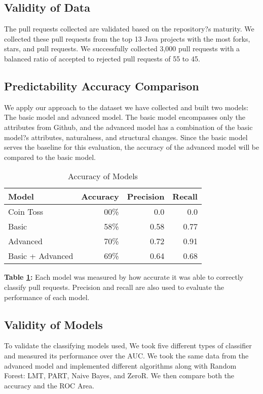 \documentclass[10pt, conference]{IEEEtran}
\begin{document}
\subsection{Validity of Data}
The pull requests collected are validated based on the repository?s maturity. We collected these pull requests from the top 13 Java projects with the most forks, stars, and pull requests. We successfully collected 3,000 pull requests with a balanced ratio of accepted to rejected pull requests of 55 to 45.

\subsection{Predictability Accuracy Comparison}
We apply our approach to the dataset we have collected and built two models: The basic model and advanced model. The basic model encompasses only the attributes from Github, and the advanced model has a combination of the basic model?s attributes, naturalness, and structural changes. Since the basic model serves the baseline for this evaluation, the accuracy of the advanced model will be compared to the basic model. 

\begin{table}[h!]
  \centering
  \caption{Accuracy of Models}
  \label{tab:FigureII}
  \begin{tabular}{lrrr}
    \toprule
    \textbf {Model} & \textbf{Accuracy} & \textbf{Precision} & \textbf{Recall}\\ %
    \midrule
    Coin Toss & 00\% & 0.0 & 0.0\\ %
    Basic & 58\% & 0.58 & 0.77\\ %
    Advanced & 70\% & 0.72 & 0.91\\ %
    Basic + Advanced & 69\% & 0.64 & 0.68\\ %
    \bottomrule
  \end{tabular}
  \break
  \break
\textbf{Table \ref{tab:FigureII}:} Each model was measured by how accurate it was able to correctly classify pull requests. Precision and recall are also used to evaluate the performance of each model.
\end{table}

\subsection{Validity of Models}
To validate the classifying models used, We took five different types of classifier and measured its performance over the AUC. We took the same data from the advanced model and implemented different algorithms along with Random Forest: LMT, PART, Naive Bayes, and ZeroR. We then compare both the accuracy and the ROC Area.
\end{document}
